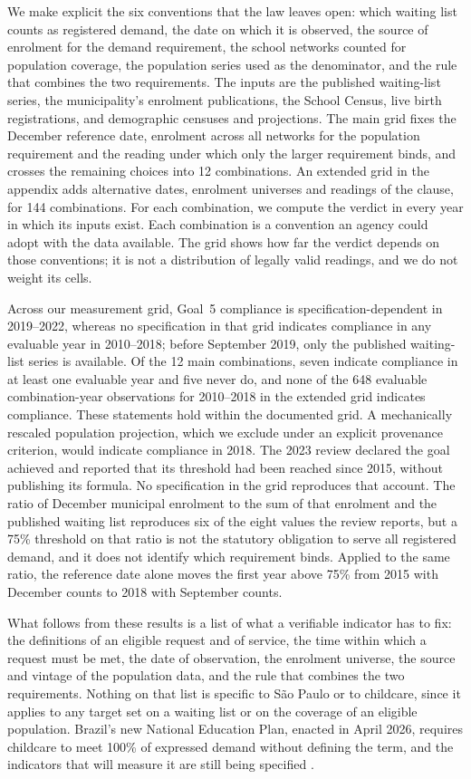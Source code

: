 We make explicit the six conventions that the law leaves open: which waiting list counts as registered demand, the date on which it is observed, the source of enrolment for the demand requirement, the school networks counted for population coverage, the population series used as the denominator, and the rule that combines the two requirements. The inputs are the published waiting-list series, the municipality's enrolment publications, the School Census, live birth registrations, and demographic censuses and projections. The main grid fixes the December reference date, enrolment across all networks for the population requirement and the reading under which only the larger requirement binds, and crosses the remaining choices into 12 combinations. An extended grid in the appendix adds alternative dates, enrolment universes and readings of the clause, for 144 combinations. For each combination, we compute the verdict in every year in which its inputs exist. Each combination is a convention an agency could adopt with the data available. The grid shows how far the verdict depends on those conventions; it is not a distribution of legally valid readings, and we do not weight its cells.

Across our measurement grid, Goal~5 compliance is specification-dependent in 2019--2022, whereas no specification in that grid indicates compliance in any evaluable year in 2010--2018; before September 2019, only the published waiting-list series is available. Of the 12 main combinations, seven indicate compliance in at least one evaluable year and five never do, and none of the 648 evaluable combination-year observations for 2010--2018 in the extended grid indicates compliance. These statements hold within the documented grid. A mechanically rescaled population projection, which we exclude under an explicit provenance criterion, would indicate compliance in 2018. The 2023 review declared the goal achieved and reported that its threshold had been reached since 2015, without publishing its formula. No specification in the grid reproduces that account. The ratio of December municipal enrolment to the sum of that enrolment and the published waiting list reproduces six of the eight values the review reports, but a 75\% threshold on that ratio is not the statutory obligation to serve all registered demand, and it does not identify which requirement binds. Applied to the same ratio, the reference date alone moves the first year above 75\% from 2015 with December counts to 2018 with September counts.

What follows from these results is a list of what a verifiable indicator has to fix: the definitions of an eligible request and of service, the time within which a request must be met, the date of observation, the enrolment universe, the source and vintage of the population data, and the rule that combines the two requirements. Nothing on that list is specific to S\~ao Paulo or to childcare, since it applies to any target set on a waiting list or on the coverage of an eligible population. Brazil's new National Education Plan, enacted in April 2026, requires childcare to meet 100\% of expressed demand without defining the term, and the indicators that will measure it are still being specified \citep{brasil2026pne,mec2026portaria701}.

